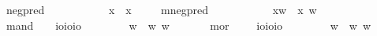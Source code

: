 \begin{isabellebody}
\ negpred\ {\isacharcolon}{\isacharcolon}\ {\isachardoublequoteopen}{\isasymlangle}{\isasymzero}{\isasymrangle}{\isasymRightarrow}{\isasymlangle}{\isasymzero}{\isasymrangle}{\isachardoublequoteclose}\ {\isacharparenleft}{\isachardoublequoteopen}{\isasymrightharpoondown}{\isacharunderscore}{\isachardoublequoteclose}{\isacharbrackleft}{}{}{\isacharbrackright}{}{}{\isacharparenright}\ \isanewline
\ \ \ \ \ {\isachardoublequoteopen}{\isasymrightharpoondown}{\isasymPhi}\ {\isasymequiv}\ {\isasymlambda}x{\isachardot}\ {\isasymnot}{\isacharparenleft}{\isasymPhi}\ x{\isacharparenright}{\isachardoublequoteclose}\ \isanewline
\ \ \isamarkupfalse%
\ mnegpred\ {\isacharcolon}{\isacharcolon}\ {\isachardoublequoteopen}{\isasymup}{\isasymlangle}{\isasymzero}{\isasymrangle}{\isasymRightarrow}{\isasymup}{\isasymlangle}{\isasymzero}{\isasymrangle}{\isachardoublequoteclose}\ {\isacharparenleft}{\isachardoublequoteopen}\ \isanewline
\ \ \ \ \ {\isachardoublequoteopen}\isactrlbold {\isasymrightharpoondown}{\isasymPhi}\ {\isasymequiv}\ {\isasymlambda}x{\isachardot}{\isasymlambda}w{\isachardot}\ {\isasymnot}{\isacharparenleft}{\isasymPhi}\ x\ w{\isacharparenright}{\isachardoublequoteclose}\isanewline
\ \ \isamarkupfalse%
\ mand\ \ \ {\isacharcolon}{\isacharcolon}\ {\isachardoublequoteopen}io{\isasymRightarrow}io{\isasymRightarrow}io{\isachardoublequoteclose}\ {\isacharparenleft}\isanewline
\ \ \ \ \ {\isachardoublequoteopen}{\isasymphi}\isactrlbold {\isasymand}{\isasympsi}\ {\isasymequiv}\ {\isasymlambda}w{\isachardot}\ {\isacharparenleft}{\isasymphi}\ w{\isacharparenright}{\isasymand}{\isacharparenleft}{\isasympsi}\ w{\isacharparenright}{\isachardoublequoteclose}\ \ \ \isanewline
\ \ \isamarkupfalse%
\ mor\ \ \ \ {\isacharcolon}{\isacharcolon}\ {\isachardoublequoteopen}io{\isasymRightarrow}io{\isasymRightarrow}io{\isachardoublequoteclose}\ {\isacharparenleft}\isanewline
\ \ \ \ \ {\isachardoublequoteopen}{\isasymphi}\isactrlbold {\isasymor}{\isasympsi}\ {\isasymequiv}\ {\isasymlambda}w{\isachardot}\ {\isacharparenleft}{\isasymphi}\ w{\isacharparenright}{\isasymor}{\isacharparenleft}{\isasympsi}\ w{\isacharparenright}{\isachardoublequoteclose}\isanewline

\end{isabellebody}
